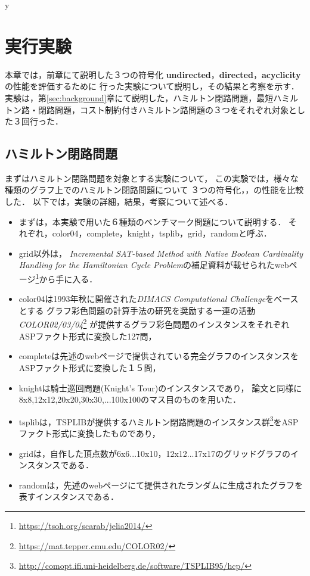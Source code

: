 y%
\chapter{実行実験}\label{chap:experiment}
本章では，前章にて説明した３つの符号化
\textbf{undirected}，\textbf{directed}，\textbf{acyclicity}
の性能を評価するために
行った実験について説明し，その結果と考察を示す．
実験は，第\ref{sec:background}章にて説明した，ハミルトン閉路問題，最短ハミルトン路・閉路問題，コスト制約付きハミルトン路問題の３つをそれぞれ対象とした３回行った．
\section{ハミルトン閉路問題}
まずはハミルトン閉路問題を対象とする実験について，
この実験では，様々な種類のグラフ上でのハミルトン閉路問題について
３つの符号化，，の性能を比較した．
以下では，実験の詳細，結果，考察について述べる．

\begin{itemize}
\item まずは，本実験で用いた６種類のベンチマーク問題について説明する．
それぞれ，color04，complete，knight，tsplib，grid，randomと呼ぶ．
\item grid以外は，
\textit{Incremental SAT-based Method with Native Boolean Cardinality Handling for the Hamiltonian Cycle Problem}\cite{soh14}の補足資料が載せられたwebページ\footnote{\url{https://tsoh.org/scarab/jelia2014/}}から手に入る．

\item color04は1993年秋に開催された\textit{DIMACS Computational Challenge}をベースとする
グラフ彩色問題の計算手法の研究を奨励する一連の活動
\textit{COLOR02/03/04}\footnote{\url{https://mat.tepper.cmu.edu/COLOR02/}}
が提供するグラフ彩色問題のインスタンスをそれぞれASPファクト形式に変換した127問，
\item completeは先述のwebページ\footnotemark[1]で提供されている完全グラフのインスタンスをASPファクト形式に変換した１５問，
\item knightは騎士巡回問題(Knight's Tour)のインスタンスであり，
論文\cite{soh14}と同様に8x8,12x12,20x20,30x30,...100x100のマス目のものを用いた．
\item tsplibは，TSPLIBが提供するハミルトン閉路問題のインスタンス群\footnote{\url{http://comopt.ifi.uni-heidelberg.de/software/TSPLIB95/hcp/}}をASPファクト形式に変換したものであり，
\item gridは，自作した頂点数が6x6...10x10，12x12...17x17のグリッドグラフのインスタンスである．
\item randomは，先述のwebページ\footnotemark[1]にて提供されたランダムに生成されたグラフを表すインスタンスである．
\end{itemize}

